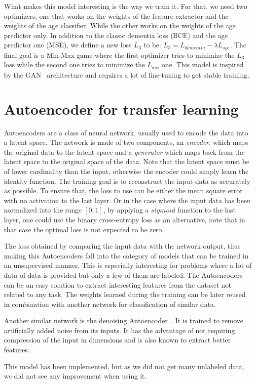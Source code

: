 What makes this model interesting is the way we train it. For that, we need two optimizers, one that works on the weights of the feature extractor and the weights of the age classifier. While the other works on the weights of the age predictor only. In addition to the classic dementia loss (BCE) and the age predictor one (MSE), we define a new loss $L_{3}$ to be: $L_3 = L_{dementia} - \lambda L_{age}$. The final goal is a Min-Max game where the first optimizer tries to minimize the $L_3$ loss while the second one tries to minimize the $L_{age}$ one. This model is inspired by the GAN~\cite{goodfellow2014generative} architecture and requires a lot of fine-tuning to get stable training.


\section{Autoencoder for transfer learning}
Autoencoders are a class of neural network, usually used to encode the data into a latent space. The network is made of two components, an \textit{encoder}, which maps the original data to the latent space and a \textit{generator} which maps back from the latent space to the original space of the data. Note that the latent space must be of lower cardinality than the input, otherwise the encoder could simply learn the identity function. The training goal is to reconstruct the input data as accurately as possible. To ensure that, the loss to use can be either the mean square error with no activation to the last layer. Or in the case where the input data has been normalized into the range $[0, 1]$, by applying a $sigmoid$ function to the last layer, one could use the binary cross-entropy loss as an alternative, note that in that case the optimal loss is not expected to be zero.

The loss obtained by comparing the input data with the network output, thus making this Autoencoders fall into the category of models that can be trained in an unsupervised manner. This is especially interesting for problems where a lot of data of data is provided but only a few of them are labeled. The Autoencoders can be an easy solution to extract interesting features from the dataset not related to any task. The weights learned during the training can be later reused in combination with another network for classification of similar data.

Another similar network is the denoising Autoencoder~\cite{denoising_autoencoder_10.5555/1756006.1953039}. It is trained to remove artificially added noise from its inputs. It has the advantage of not requiring compression of the input in dimensions and is also known to extract better features.

This model has been implemented, but as we did not get many unlabeled data, we did not see any improvement when using it.
